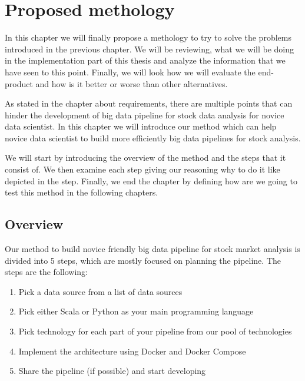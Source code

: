\chapter{Proposed methology}
\label{chapter:methods}


In this chapter we will finally propose a methology to try to solve the problems introduced in the previous chapter.
We will be reviewing, what we will be doing in the implementation part of this thesis and analyze the information that we have seen to this point.
Finally, we will look how we will evaluate the end-product and how is it better or worse than other alternatives.

As stated in the chapter about requirements, there are multiple points that can hinder the development of big data pipeline for stock data analysis for novice data scientist.
In this chapter we will introduce our method which can help novice data scientist to build more efficiently big data pipelines for stock analysis.

We will start by introducing the overview of the method and the steps that it consist of.
We then examine each step giving our reasoning why to do it like depicted in the step.
Finally, we end the chapter by defining how are we going to test this method in the following chapters.

\section{Overview}

Our method to build novice friendly big data pipeline for stock market analysis is divided into 5 steps, which are mostly focused on planning the pipeline.
The steps are the following:

\begin{enumerate}
    \item Pick a data source from a list of data sources
    \item Pick either Scala or Python as your main programming language
    \item Pick technology for each part of your pipeline from our pool of technologies
    \item Implement the architecture using Docker and Docker Compose
    \item Share the pipeline (if possible) and start developing
\end{enumerate}

